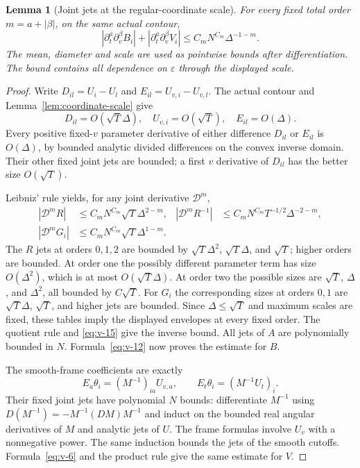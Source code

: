 \documentclass[11pt]{article}
\numberwithin{equation}{section}
\newtheorem{lemma}[theorem]{Lemma}
\theoremstyle{remark}\newtheorem{remark}[theorem]{Remark}
\begin{document}
\begin{lemma}[Joint jets at the regular-coordinate scale]\label{lem:jets}
For every fixed total order $m=a+|\beta|$, on the same actual contour,
\begin{equation}\label{eq:v-14}
 |\partial_t^a\partial_v^\beta B_i|
 +|\partial_t^a\partial_v^\beta V_i|
 \le C_mN^{C_m}\Delta^{-1-m}.
\end{equation}
The mean, diameter and scale are used as pointwise bounds after
differentiation. The bound contains all dependence on $\varepsilon$
through the displayed scale.
\end{lemma}
\begin{proof}
Write $D_{il}=U_i-U_l$ and $E_{il}=U_{v,i}-U_{v,l}$.
The actual contour and Lemma~\ref{lem:coordinate-scale} give
\[
 D_{il}=O(\sqrt T\Delta),\quad U_{v,i}=O(\sqrt T),\quad
 E_{il}=O(\Delta).
\]
Every positive fixed-$v$ parameter derivative of either difference
$D_{il}$ or $E_{il}$ is $O(\Delta)$, by bounded analytic divided
differences on the convex inverse domain. Their other fixed joint
jets are bounded; a first $v$ derivative of $D_{il}$ has the
better size $O(\sqrt T)$.

Leibniz' rule yields, for any joint derivative $\mathcal D^m$,
\begin{equation}\label{eq:sharp-R}
 \begin{aligned}
 |\mathcal D^mR|&\le C_mN^{C_m}\sqrt T\Delta^{2-m},&
 |\mathcal D^mR^{-1}|&\le C_mN^{C_m}T^{-1/2}\Delta^{-2-m},\\
 |\mathcal D^mG_i|&\le C_mN^{C_m}\sqrt T\Delta^{1-m}.&&
 \end{aligned}
\end{equation}
The $R$ jets at orders
$0,1,2$ are bounded by
$\sqrt T\Delta^2$, $\sqrt T\Delta$, and $\sqrt T$;
higher orders are bounded. At order one the possibly different
parameter term has size $O(\Delta^2)$, which is at most
$O(\sqrt T\Delta)$. At order two the possible sizes are
$\sqrt T$, $\Delta$, and $\Delta^2$, all bounded by
$C\sqrt T$. For $G_i$ the corresponding sizes at orders
$0,1$ are $\sqrt T\Delta$, $\sqrt T$, and higher jets are
bounded. Since $\Delta\le\sqrt T$ and maximum scales are
fixed, these tables imply the displayed envelopes at every fixed
order. The quotient rule and \eqref{eq:v-15} give the inverse
bound. All jets of $A$ are polynomially bounded in $N$.
Formula~\eqref{eq:v-12} now proves the estimate for $B$.

The smooth-frame coefficients are exactly
\[
 E_a\theta_i=(M^{-1})_{ia}U_{v,a},\qquad
 E_t\theta_i=(M^{-1}U_t)_i.
\]
Their fixed joint jets have polynomial $N$ bounds: differentiate
$M^{-1}$ using $D(M^{-1})=-M^{-1}(DM)M^{-1}$ and induct on
the bounded real angular derivatives of $M$ and analytic jets of $U$.
The frame formulas involve $U_v$ with a nonnegative power.
The same induction bounds the jets of the smooth cutoffs.
Formula~\eqref{eq:v-6} and the product rule give the same
estimate for $V$.
\end{proof}
\end{document}
